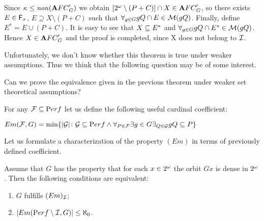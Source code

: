   Since $\kappa \leq {\it non}({\mathbf AFC}^\prime_{G})$ we obtain
$[ 2^{\omega} \setminus (P+C)] \cap X \in {\mathbf AFC}^\prime_{G}$,
so there exists $E \in {\sf F}_{\sigma}$,
$E \supseteq X \setminus (P + C)$ such that
$\forall_{g \in G} gQ \cap E \in {\cal M}(gQ)$.
  Finally, define $E^* = E \cup (P + C)$.
It is easy to see that $X \subseteq E^*$ and
$\forall_{g \in G} gQ \cap E^* \in {\cal M}(gQ)$.
  Hence $X \in {\mathbf AFC}^\prime_{G}$ and the proof is
completed, since X does not belong to ${\cal I}$.
\medskip

  Unfortunately, we don't know whether this
theorem is true under weaker assumptions.
  Thus we think that the following question may be of
some interest.

\begin{question}
Can we prove the equivalence given in the previous theorem
under weaker set theoretical assumptions?
\end{question}


  For any ${\mathcal{F}} \subseteq {\mathrm Perf}$ 
let us define the following useful cardinal coefficient:
\begin{definition}
$Em({\mathcal{F}}, G) = \min\{|{\cal G}|\colon {\cal G}\subseteq {\mathrm Perf} \wedge 
\forall_{P\in{\mathcal{F}}} \exists{g\in G} \exists_{Q\in{\cal G}} gQ \subseteq P\}$
\end{definition}

  Let us formulate a characterization of the property 
$(Em)$ in terms of previously defined coefficient.

Assume that $G$ has the property that for each $x\in2^{\omega}$
the orbit $Gx$ is dense in $2^{\omega}$.
Then the following conditions are equivalent:

\begin{enumerate}
\item
  $G$ fulfills $(Em)_{{\cal I}}$; 
\item
  $|Em({\mathrm Perf}\setminus {\cal I}, G) | \leq \aleph_0$.
\end{enumerate}

